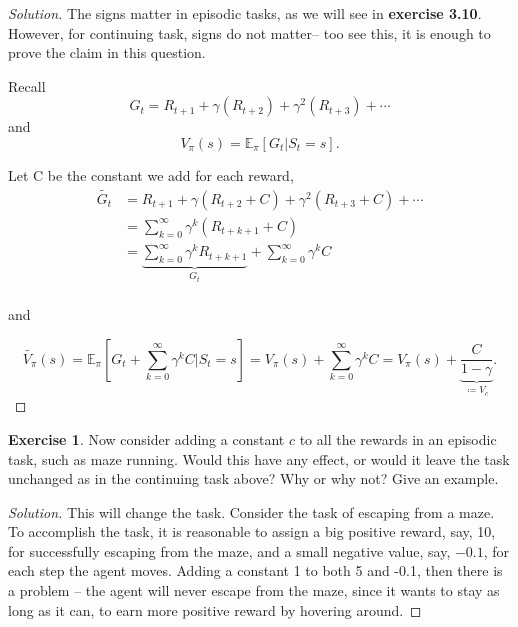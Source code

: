 \documentclass[oneside,11pt]{article}
\theoremstyle{definition}
\newtheorem{exer}[thm]{Exercise}
\newcommand{\EEpi}{\mathbb{E}_{\pi}}
\newenvironment{solution}
{\renewcommand\qedsymbol{$\blacksquare$}\begin{proof}[Solution]} {\end{proof}}
\begin{document}
\begin{shaded}
\begin{solution} 
The signs matter in episodic tasks, as we will see in \textbf{exercise 3.10}. However, for continuing task, signs do not matter-- too see this, it is enough to prove the claim in this question.

Recall
\[ G_t  =  R_{t+1} + \gamma (R_{t+2} ) + \gamma^2 (R_{t+3} ) + \cdots \]
and
\[ V_{\pi}(s)  =  \EEpi [G_t | S_t = s]. \]

Let C be the constant we add for each reward,
\begin{equation*} %
\begin{split}
\tilde{G_t} & =  R_{t+1} + \gamma (R_{t+2} +C) + \gamma^2 (R_{t+3} +C) + \cdots \\
 & = \sum_{k = 0}^{\infty} \gamma^k (R_{t+k+1}+ C) \\
 & = \underbrace{ \sum_{k = 0}^{\infty} \gamma^k R_{t+k+1}}_{G_t}+ \sum_{k = 0}^{\infty} \gamma^k C \\
\end{split}
\end{equation*}


and

\[ \tilde{V_{\pi}}(s)  =  \EEpi [G_t + \sum_{k = 0}^{\infty} \gamma^k C | S_t = s] = V_{\pi}(s) +  \sum_{k = 0}^{\infty} \gamma^k C = V_{\pi}(s) + \underbrace{\frac{C}{1 - \gamma}}_{ \coloneqq V_c}. \]

\end{solution}
\end{shaded}

\begin{exer}
Now consider adding a constant $c$ to all the rewards in an episodic task, such as maze running. Would this have any effect, or would it leave the task unchanged as in the continuing task above? Why or why not? Give an example.
\end{exer}
\begin{shaded}
\begin{solution} 
This will change the task. Consider the task of escaping from a maze. To accomplish the task, it is reasonable to assign a big positive reward, say, 10, for successfully escaping from the maze, and a small negative value, say, $-0.1$, for each step the agent moves. Adding a constant 1 to both 5 and -0.1, then there is a problem -- the agent will never escape from the maze, since it wants to stay as long as it can, to earn more positive reward by hovering around.
\end{solution}
\end{shaded}
\end{document}
